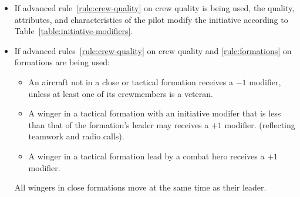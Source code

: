 {\begin{itemize}
    \item{} If advanced rule~\ref{rule:crew-quality} on crew quality is being used, the quality, attributes, and characteristics of the pilot modify the initiative according to Table~\ref{table:initiative-modifiers}.

	\item{} If advanced rules~\ref{rule:crew-quality} on crew quality and \ref{rule:formations} on formations are being used:
    \begin{itemize}
        \item An aircraft not in a close or tactical formation receives a $-1$ modifier, unless at least one of its crewmembers is a veteran.
        \item A winger in a tactical formation with an initiative modifer that is less than that of the formation’s leader may  receives a $+1$ modifier. (reflecting teamwork and radio calls).
        \item A winger in a tactical formation lead by a combat hero receives a $+1$ modifier.
    \end{itemize}
    All wingers in close formations move at the same time as their leader.
\end{itemize}

}


